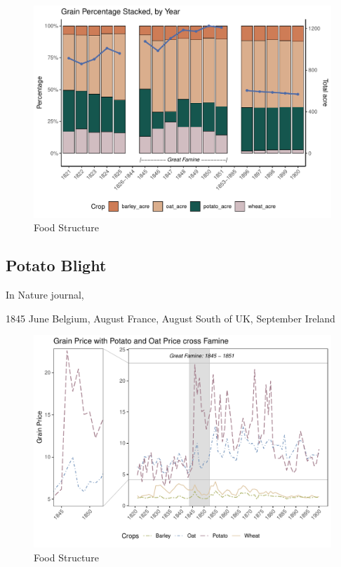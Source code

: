 \begin{figure}[h]
    \centering
    \caption{Food Structure}
    \includegraphics[width=.9\textwidth]{../03_outputs/food_structure.pdf}
\end{figure}

\subsection{Potato Blight}

In Nature journal,

1845 June Belgium, August France, August South of UK, September Ireland

\begin{figure}[h]
    \centering
    \caption{Food Structure}
    \includegraphics[width=.95\textwidth]{../03_outputs/grain_price.pdf}
\end{figure}



